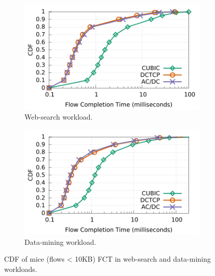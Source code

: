 \begin{figure}[!t]
        \centering
        \begin{subfigure}[b]{0.45\textwidth}
                \centering
                \includegraphics[width=\textwidth]{acdctcp/figures/macro_benchmarks/trace-driven/trace_driven_workload_dctcp_senders5_10points.pdf}
                \caption{Web-search workload.}
                \label{trace-driven-searching-fct}
        \end{subfigure}
        \begin{subfigure}[b]{0.45\textwidth}
                \centering
                \includegraphics[width=\textwidth]{acdctcp/figures/macro_benchmarks/trace-driven/trace_driven_workload_conga_senders5_10points.pdf}
                \caption{Data-mining workload.}
                \label{trace-driven-data-mining-fct}
        \end{subfigure}
        \caption{CDF of mice (flows < 10KB) FCT in web-search and data-mining workloads.}
        \label{macro-trace-driven-fct}
\end{figure}

